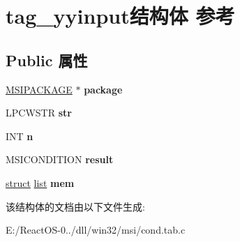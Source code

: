 \hypertarget{structtag__yyinput}{}\section{tag\+\_\+yyinput结构体 参考}
\label{structtag__yyinput}
\subsection*{Public 属性}
\begin{DoxyCompactItemize}
\item 
\mbox{\label{structtag__yyinput_a461a9e0e6c61d6dfb572f9341793c956}} 
\hyperlink{structtag_m_s_i_p_a_c_k_a_g_e}{M\+S\+I\+P\+A\+C\+K\+A\+GE} $\ast$ {\bfseries package}
\item 
\mbox{\label{structtag__yyinput_a027e7197bacc9720bfef28dea6cbd0a7}} 
L\+P\+C\+W\+S\+TR {\bfseries str}
\item 
\mbox{\label{structtag__yyinput_ac14378c6dce80292ef6ab25912584c30}} 
I\+NT {\bfseries n}
\item 
\mbox{\label{structtag__yyinput_add6c06dfa116bb2b23b9f5aa6f990ffd}} 
M\+S\+I\+C\+O\+N\+D\+I\+T\+I\+ON {\bfseries result}
\item 
\mbox{\label{structtag__yyinput_a71633693a2fd1523ae36a55be1f327d1}} 
\hyperlink{interfacestruct}{struct} \hyperlink{classlist}{list} {\bfseries mem}
\end{DoxyCompactItemize}


该结构体的文档由以下文件生成\+:\begin{DoxyCompactItemize}
\item 
E\+:/\+React\+O\+S-\/0../dll/win32/msi/cond.\+tab.\+c\end{DoxyCompactItemize}
